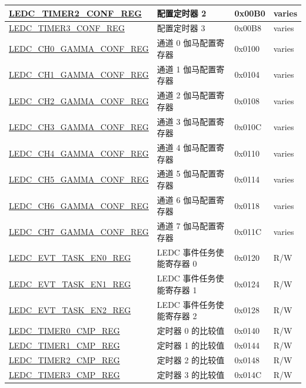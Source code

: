 \begin{longtable}{ | p{6cm} | p{4.5cm} | p{1.3cm} | p{1.7cm} | }
\hyperref[regdesc:LEDCTIMERXCONFREG]{LEDC\_TIMER2\_CONF\_REG} & 配置定时器 2 & 0x00B0 & varies \\ \hline
\hyperref[regdesc:LEDCTIMERXCONFREG]{LEDC\_TIMER3\_CONF\_REG} & 配置定时器 3 & 0x00B8 & varies \\ \hline
\hyperref[regdesc:LEDCCHNGAMMACONFREG]{LEDC\_CH0\_GAMMA\_CONF\_REG} & 通道 0 伽马配置寄存器 & 0x0100 & varies \\ \hline
\hyperref[regdesc:LEDCCHNGAMMACONFREG]{LEDC\_CH1\_GAMMA\_CONF\_REG} & 通道 1 伽马配置寄存器 & 0x0104 & varies \\ \hline
\hyperref[regdesc:LEDCCHNGAMMACONFREG]{LEDC\_CH2\_GAMMA\_CONF\_REG} & 通道 2 伽马配置寄存器 & 0x0108 & varies \\ \hline
\hyperref[regdesc:LEDCCHNGAMMACONFREG]{LEDC\_CH3\_GAMMA\_CONF\_REG} & 通道 3 伽马配置寄存器 & 0x010C & varies \\ \hline
\hyperref[regdesc:LEDCCHNGAMMACONFREG]{LEDC\_CH4\_GAMMA\_CONF\_REG} & 通道 4 伽马配置寄存器 & 0x0110 & varies \\ \hline
\hyperref[regdesc:LEDCCHNGAMMACONFREG]{LEDC\_CH5\_GAMMA\_CONF\_REG} & 通道 5 伽马配置寄存器 & 0x0114 & varies \\ \hline
\hyperref[regdesc:LEDCCHNGAMMACONFREG]{LEDC\_CH6\_GAMMA\_CONF\_REG} & 通道 6 伽马配置寄存器 & 0x0118 & varies \\ \hline
\hyperref[regdesc:LEDCCHNGAMMACONFREG]{LEDC\_CH7\_GAMMA\_CONF\_REG} & 通道 7 伽马配置寄存器 & 0x011C & varies \\ \hline
\hyperref[regdesc:LEDCEVTTASKEN0REG]{LEDC\_EVT\_TASK\_EN0\_REG} & LEDC 事件任务使能寄存器 0 & 0x0120 & R/W \\ \hline
\hyperref[regdesc:LEDCEVTTASKEN1REG]{LEDC\_EVT\_TASK\_EN1\_REG} & LEDC 事件任务使能寄存器 1 & 0x0124 & R/W \\ \hline
\hyperref[regdesc:LEDCEVTTASKEN2REG]{LEDC\_EVT\_TASK\_EN2\_REG} & LEDC 事件任务使能寄存器 2 & 0x0128 & R/W \\ \hline
\hyperref[regdesc:LEDCTIMERXCMPREG]{LEDC\_TIMER0\_CMP\_REG} & 定时器 0 的比较值 & 0x0140 & R/W \\ \hline
\hyperref[regdesc:LEDCTIMERXCMPREG]{LEDC\_TIMER1\_CMP\_REG} & 定时器 1 的比较值 & 0x0144 & R/W \\ \hline
\hyperref[regdesc:LEDCTIMERXCMPREG]{LEDC\_TIMER2\_CMP\_REG} & 定时器 2 的比较值 & 0x0148 & R/W \\ \hline
\hyperref[regdesc:LEDCTIMERXCMPREG]{LEDC\_TIMER3\_CMP\_REG} & 定时器 3 的比较值 & 0x014C & R/W \\ \hline

\end{longtable}
